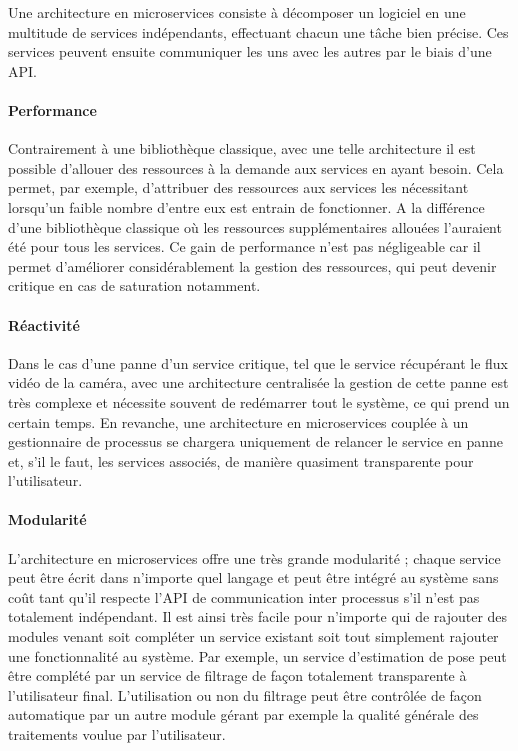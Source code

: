 Une architecture en microservices consiste à décomposer un logiciel en une multitude de services indépendants, effectuant chacun une tâche bien précise. Ces services peuvent ensuite communiquer les uns avec les autres par le biais d'une API.

\paragraph{Performance} Contrairement à une bibliothèque classique, avec une telle architecture il est possible d'allouer des ressources à la demande aux services en ayant besoin. Cela permet, par exemple, d'attribuer des ressources aux services les nécessitant lorsqu'un faible nombre d'entre eux est entrain de fonctionner. A la différence d'une bibliothèque classique où les ressources supplémentaires allouées l'auraient été pour tous les services. Ce gain de performance n'est pas négligeable car il permet d'améliorer considérablement la gestion des ressources, qui peut devenir critique en cas de saturation notamment.

\paragraph{Réactivité} Dans le cas d'une panne d'un service critique, tel que le service récupérant le flux vidéo de la caméra, avec une architecture centralisée la gestion de cette panne est très complexe et nécessite souvent de redémarrer tout le système, ce qui prend un certain temps. En revanche, une architecture en microservices couplée à un gestionnaire de processus se chargera uniquement de relancer le service en panne et, s'il le faut, les services associés, de manière quasiment transparente pour l'utilisateur.

\paragraph{Modularité} L'architecture en microservices offre une très grande modularité ; chaque service peut être écrit dans n'importe quel langage et peut être intégré au système sans coût tant qu'il respecte l'API de communication inter processus s'il n'est pas totalement indépendant. Il est ainsi très facile pour n'importe qui de rajouter des modules venant soit compléter un service existant soit tout simplement rajouter une fonctionnalité au système. Par exemple, un service d'estimation de pose peut être complété par un service de filtrage de façon totalement transparente à l'utilisateur final. L'utilisation ou non du filtrage peut être contrôlée de façon automatique par un autre module gérant par exemple la qualité générale des traitements voulue par l'utilisateur.

